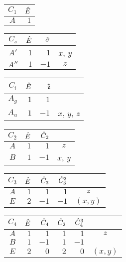 \documentclass[../../Atom-ogMolekylefysik.tex]{subfiles}
\begin{document}
\twocolumn
    \begin{tabular}{c|r}
    $C_1$ & $\hat E$\\\hline
    $A$ & $1$
    \end{tabular}
    
    \vspace{1cm}
    
    \begin{tabular}{c|r r|c}
    $C_s$ & $\hat E$ & $\hat \sigma$\\\hline
    $A'$ & $1$ & $1$ & $x$, $y$\\
    $A''$ & $1$ & $-1$ & $z$
    \end{tabular}
    
    \vspace{1cm}
    
    \begin{tabular}{c|r r|c}
    $C_i$ & $\hat E$ & \textit{\^\i}\\\hline
    $A_g$ & $1$ & $1$ &\\
    $A_u$ & $1$ & $-1$ & $x$, $y$, $z$
    \end{tabular}

\vspace{1cm}
    \begin{tabular}{c|r r|c}
    $C_2$ & $\hat E$ & $\hat C_2$\\\hline
    $A$ & $1$ & $1$ & $z$\\
    $B$ & $1$ & $-1$ & $x$, $y$
    \end{tabular}

\vspace{1cm}
    \begin{tabular}{c|r r r|c}
    $C_3$ & $\hat E$ & $\hat C_3$ & $\hat C_3^2$\\\hline
    $A$ & $1$ & $1$ & $1$ & $z$\\
    $E$ & $2$ & $-1$ & $-1$ & $(x,y)$
    \end{tabular}

\vspace{1cm}

    \begin{tabular}{c|r r r r|c}
    $C_4$ & $\hat E$ & $\hat C_4$ & $\hat C_2$ & $\hat C_4^3$\\\hline
    $A$ & $1$ & $1$ & $1$ & $1$ & $z$\\
    $B$ & $1$ & $-1$ & $1$ & $-1$\\
    $E$ & $2$ & $0$ & $2$ & $0$ & $(x,y)$
    \end{tabular}

\vspace{1cm}
\end{document}
